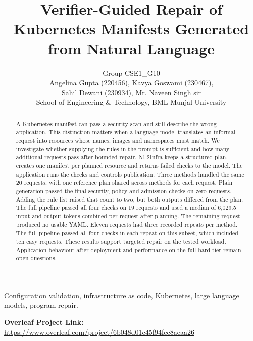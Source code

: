 \documentclass[12pt,onecolumn,draftclsnofoot]{IEEEtran}
\begin{document}
\title{Verifier-Guided Repair of Kubernetes Manifests Generated from Natural Language}
\author{Group CSE1\_G10\\Angelina Gupta (220456), Kavya Goswami (230467),\\
Sahil Dewani (230934), Mr. Naveen Singh sir\\
School of Engineering \& Technology, BML Munjal University}
\maketitle
\begin{abstract}
A Kubernetes manifest can pass a security scan and still describe the wrong application. This distinction matters when a language model translates an informal request into resources whose names, images and namespaces must match. We investigate whether supplying the rules in the prompt is sufficient and how many additional requests pass after bounded repair. NL2Infra keeps a structured plan, creates one manifest per planned resource and returns failed checks to the model. The application runs the checks and controls publication. Three methods handled the same 20 requests, with one reference plan shared across methods for each request. Plain generation passed the final security, policy and admission checks on zero requests. Adding the rule list raised that count to two, but both outputs differed from the plan. The full pipeline passed all four checks on 19 requests and used a median of 6,029.5 input and output tokens combined per request after planning. The remaining request produced no usable YAML. Eleven requests had three recorded repeats per method. The full pipeline passed all four checks in each repeat on this subset, which included ten easy requests. These results support targeted repair on the tested workload. Application behaviour after deployment and performance on the full hard tier remain open questions.
\end{abstract}
\begin{IEEEkeywords}
Configuration validation, infrastructure as code, Kubernetes, large language models, program repair.
\end{IEEEkeywords}
\noindent\textbf{Overleaf Project Link:} \url{https://www.overleaf.com/project/6b048d01c45f94fcc8aeaa26}
\end{document}
